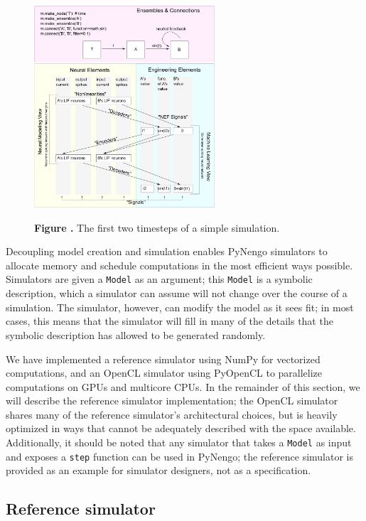 \documentclass{frontiersSCNS}
\begin{document}
\begin{figure}
\begin{center}
  \includegraphics[width=0.6\textwidth]{sim}
\end{center}
 \textbf{\label{fig:sim} Figure .}{
   The first two timesteps of a simple simulation.}
\end{figure}


Decoupling model creation and simulation
enables PyNengo simulators
to allocate memory and schedule computations
in the most efficient ways possible.
Simulators are given a \texttt{Model}
as an argument;
this \texttt{Model} is a symbolic description,
which a simulator can assume will not change
over the course of a simulation.
The simulator, however,
can modify the model as it sees fit;
in most cases, this means that the simulator
will fill in many of the details
that the symbolic description
has allowed to be generated randomly.

We have implemented
a reference simulator using NumPy
for vectorized computations,
and an OpenCL simulator
using PyOpenCL to parallelize
computations on GPUs and multicore CPUs.
In the remainder of this section,
we will describe
the reference simulator implementation;
the OpenCL simulator shares many
of the reference simulator's architectural choices,
but is heavily optimized in ways
that cannot be adequately described
with the space available.
Additionally, it should be noted that
any simulator that takes a \texttt{Model}
as input and exposes a \texttt{step}
function can be used in PyNengo;
the reference simulator
is provided as an example
for simulator designers,
not as a specification.

\subsection{Reference simulator}
\end{document}
